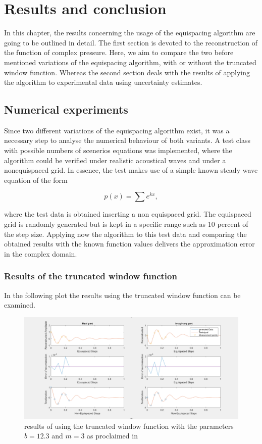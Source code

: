 \documentclass[11pt]{report} %
\begin{document}
\chapter{Results and conclusion}
In this chapter, the results concerning the usage of the equispacing algorithm are going to be outlined in detail. 
The first section is devoted to the reconstruction of the function of complex pressure.
Here, we aim to compare the two before mentioned variations of the equispacing algorithm, with or without the truncated window function. 
Whereas the second section deals with the results of applying the algorithm to experimental data using uncertainty estimates. 
 
\section{Numerical experiments}
Since two different variations of the equispacing algorithm exist, it was a necessary step to analyse the numerical behaviour of both variants.
A test class with possible numbers of scenerios equations was implemented, where the  
algorithm could be verified under realistic acoustical waves and under a nonequispaced grid.
In essence, the test makes use of a simple known steady wave equation of the form

\begin{equation}
p(x)= \sum e^{kx},
\end{equation}

where the test data is obtained inserting a non equispaced grid. 
The equispaced grid is randomly generated but is kept in a specific range such as 10 percent of the step size. 
Applying now the algorithm to this test data and comparing the obtained results with the known function values delivers the approximation error in the complex domain.

\subsection{Results of the truncated window function}
In the following plot the results using the truncated window function can be examined. 

\begin{figure}[H]
\centering
\includegraphics[scale=1]{./Figures/plot_trunc}
\caption{results of using the truncated window function with the parameters $b=12.3$ and $m=3$ as proclaimed in \citep{Peter2011}}
\end{figure}
\end{document}
